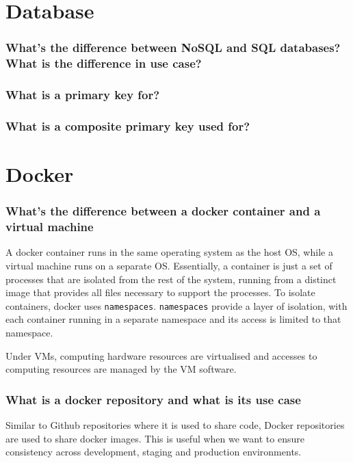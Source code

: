 \documentclass[12pt, a4paper]{article}
\newcommand{\code}[1]{\texttt{#1}}
\begin{document}
\pagebreak

\section*{Database}
\subsubsection*{What's the difference between NoSQL and SQL databases? What is the difference in use case?}

\subsubsection*{What is a primary key for?}

\subsubsection*{What is a composite primary key used for?}

\pagebreak

\section*{Docker}
\subsubsection*{What's the difference between a docker container and a virtual machine}
A docker container runs in the same operating system as the host OS, while a virtual machine runs on a separate OS.
Essentially, a container is just a set of processes that are isolated from the rest of the system, running from a distinct image that provides all files necessary to support the processes.
To isolate containers, docker uses \code{namespaces}. 
\code{namespaces} provide a layer of isolation, with each container running in a separate namespace and its access is limited to that namespace.

Under VMs, computing hardware resources are virtualised and accesses to computing resources are managed by the VM software.

\subsubsection*{What is a docker repository and what is its use case}
Similar to Github repositories where it is used to share code, Docker repositories are used to share docker images.
This is useful when we want to ensure consistency across development, staging and production environments.
\end{document}
